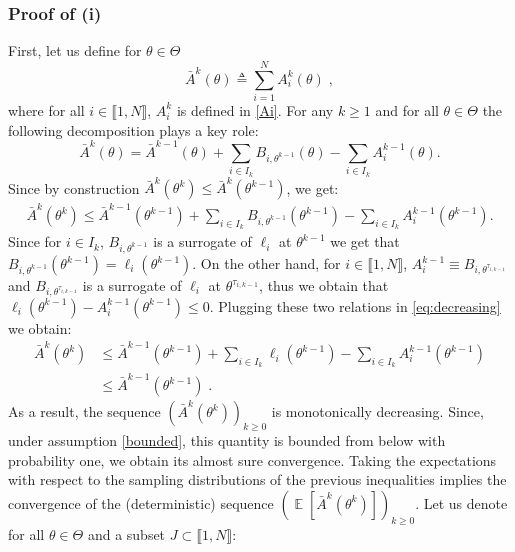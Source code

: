 \documentclass[11pt]{article}
\theoremstyle{plain}
\def\eqs{\;}
\newcommand{\loglike}{\ell}
\newcommand{\inter}{\llbracket1,N\rrbracket}
\DeclareMathOperator*{\E}{\mathbb{E}}
\theoremstyle{plain}
\theoremstyle{definition}
\begin{document}
\subsubsection{Proof of (i)}
First, let us define for $\theta \in \Theta$
\begin{equation}\label{sumsurrogate}
 \bar{A}^k(\theta) \triangleq \sum_{i=1}^{N}{A^k_i(\theta)}\eqs,
\end{equation}
where for all $i \in \inter$, $A^{k}_{i}$ is defined in \eqref{Ai}. For any $k \geq 1$ and for all $\theta \in \Theta$ the following decomposition plays a key role:
\begin{equation}\label{deterquantity}
\bar{A}^k(\theta) = \bar{A}^{k-1}(\theta) + \sum_{i \in I_{k}}^{}{B_{i,\theta^{k-1}}(\theta)} - \sum_{i \in I_{k}}^{}{A^{k-1}_{i}(\theta)}.
\end{equation}
Since by construction $\bar{A}^k(\theta^k) \leq  \bar{A}^k(\theta^{k-1})$, we get:
\begin{align}\label{eq:decreasing}
\bar{A}^k(\theta^k) \leq \bar{A}^{k-1}(\theta^{k-1}) + \sum_{i \in I_{k}}^{}{B_{i,\theta^{k-1}}(\theta^{k-1})} - \sum_{i \in I_{k}}^{}{A^{k-1}_{i}(\theta^{k-1})}.
\end{align}
Since for $i \in I_k$, $B_{i,\theta^{k-1}}$ is a surrogate of $\loglike_i$ at $\theta^{k-1}$ we get that  $B_{i,\theta^{k-1}}(\theta^{k-1}) = \loglike_{i}(\theta^{k-1})$. On the other hand, for $i \in \inter$, $A^{k-1}_{i} \equiv B_{i,\theta^{\tau_{i,k-1}}}$ and $B_{i,\theta^{\tau_{i,k-1}}}$ is a surrogate of $\loglike_i$ at $\theta^{\tau_{i,k-1}}$, thus we obtain that $ \loglike_{i}(\theta^{k-1}) - A^{k-1}_{i}(\theta^{k-1}) \leq 0$. Plugging these two relations in \eqref{eq:decreasing}  we obtain:
\begin{align}
\bar{A}^k(\theta^k) & \leq \bar{A}^{k-1}(\theta^{k-1}) + \sum_{i \in I_{k}}^{}{\loglike_{i}(\theta^{k-1})} - \sum_{i \in I_{k}}^{}{A^{k-1}_{i}(\theta^{k-1})}\\
& \leq \bar{A}^{k-1}(\theta^{k-1})\eqs.
\end{align}
As a result, the sequence $\left(\bar{A}^k(\theta^k)\right)_{k\geq0}$ is monotonically decreasing.  Since, under assumption \cref{bounded}, this quantity is bounded from below with probability one, we obtain its almost sure convergence. Taking the expectations with respect to the sampling distributions of the previous inequalities implies the convergence of the (deterministic) sequence $\left(\E[\bar{A}^k(\theta^k)]\right)_{k\geq0}$. Let us denote for all $\theta \in \Theta$ and a subset $J \subset \inter$:
\end{document}
